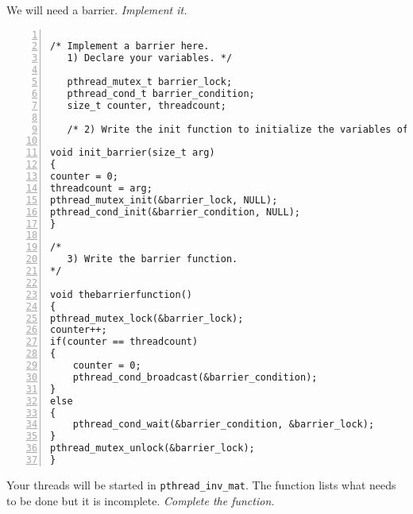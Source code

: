 \documentclass{article}
\begin{document}

\begin{ExerciseList}
\Exercise We will need a barrier.
\Question \emph{Implement it.}
\end{ExerciseList}

\begin{lstlisting}[basicstyle=\small\sffamily,
keywords={break,case,const,continue,default,else,enum,
for,if,return,switch,while,do,long,void,int,float,double,
char,struct,typedef,include,size\_t},
keywordstyle={\color{blue}},
comment={[l]{//}}, morecomment={[s]{/*}{*/}}, commentstyle=\itshape,
columns={[l]flexible}, numbers=left, numberstyle=\tiny,
frameround=fftt, frame=shadowbox, captionpos=b,
caption={Your barrier implementation.},
label=LST:barrier]

/* Implement a barrier here.
   1) Declare your variables. */
   
   pthread_mutex_t barrier_lock;
   pthread_cond_t barrier_condition;
   size_t counter, threadcount;
   
   /* 2) Write the init function to initialize the variables of your barrier. */
   
void init_barrier(size_t arg)
{
counter = 0;
threadcount = arg;
pthread_mutex_init(&barrier_lock, NULL);
pthread_cond_init(&barrier_condition, NULL);
}

/*
   3) Write the barrier function.
*/

void thebarrierfunction()
{
pthread_mutex_lock(&barrier_lock);
counter++;
if(counter == threadcount)
{
	counter = 0;
	pthread_cond_broadcast(&barrier_condition);
}
else
{
	pthread_cond_wait(&barrier_condition, &barrier_lock);
}
pthread_mutex_unlock(&barrier_lock);
}
\end{lstlisting}

\begin{ExerciseList}
  \Exercise Your threads will be started in
  \texttt{pthread\_inv\_mat}. The function lists what needs to be done
  but it is incomplete.
  \Question \emph{Complete the function.}
\end{ExerciseList}
\end{document}

